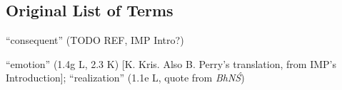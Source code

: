 \documentclass[10pt]{article}
\begin{document}
\begin{multicols}{2}


	\subsection{Original List of Terms}
	\begin{enumerate}[
			leftmargin=0em,
			rightmargin=0em,
		]
		\setlength{\itemsep}{0.15em}

		 ``consequent'' (TODO REF, IMP Intro?)

		 ``emotion'' (1.4g L, 2.3 K) [K. Kris. Also B. Perry's translation, from IMP's Introduction]; ``realization'' (1.1e L, quote from \textit{BhNŚ})


\end{enumerate}
\end{multicols}
\end{document}

